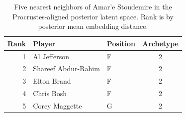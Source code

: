 \begin{table}[htbp]
  \centering\small
  \begin{tabular}{rllc}
    \toprule
    Rank & Player & Position & Archetype \\
    \midrule
    1 & Al Jefferson & F & 2 \\
    2 & Shareef Abdur-Rahim & F & 2 \\
    3 & Elton Brand & F & 2 \\
    4 & Chris Bosh & F & 2 \\
    5 & Corey Maggette & G & 2 \\
    \bottomrule
  \end{tabular}
  \caption{Five nearest neighbors of Amar'e Stoudemire in the Procrustes-aligned posterior latent space. Rank is by posterior mean embedding distance.}
\end{table}

